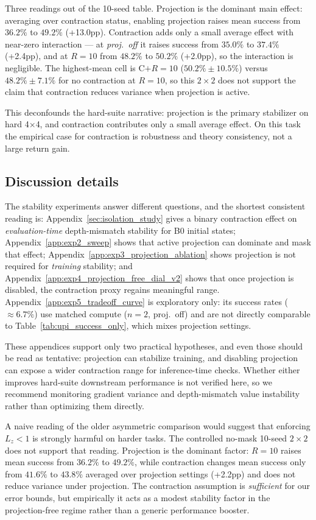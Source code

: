 \documentclass{article}
\theoremstyle{plain}
\theoremstyle{definition}
\theoremstyle{remark}
\begin{document}
Three readings out of the 10-seed table. Projection is the dominant main effect: averaging over contraction status, enabling projection raises mean success from $36.2\%$ to $49.2\%$ (+13.0pp). Contraction adds only a small average effect with near-zero interaction --- at \emph{proj.\ off} it raises success from $35.0\%$ to $37.4\%$ (+2.4pp), and at $R{=}10$ from $48.2\%$ to $50.2\%$ (+2.0pp), so the interaction is negligible. The highest-mean cell is C$+R{=}10$ ($50.2\%\pm 10.5\%$) versus $48.2\%\pm 7.1\%$ for no contraction at $R{=}10$, so this $2\times 2$ does not support the claim that contraction reduces variance when projection is active.

This deconfounds the hard-suite narrative: projection is the primary stabilizer on hard 4$\times$4, and contraction contributes only a small average effect. On this task the empirical case for contraction is robustness and theory consistency, not a large return gain.

\subsection{Discussion details}
\label{app:discussion_details}

The stability experiments answer different questions, and the shortest consistent reading is:
Appendix~\ref{sec:isolation_study} gives a binary contraction effect on \emph{evaluation-time} depth-mismatch stability for B0 initial states;
Appendix~\ref{app:exp2_sweep} shows that active projection can dominate and mask that effect;
Appendix~\ref{app:exp3_projection_ablation} shows projection is not required for \emph{training} stability;
and Appendix~\ref{app:exp4_projection_free_dial_v2} shows that once projection is disabled, the contraction proxy regains meaningful range.
Appendix~\ref{app:exp5_tradeoff_curve} is exploratory only: its success rates (${\approx}6.7\%$) use matched compute ($n{=}2$, proj.\ off) and are not directly comparable to Table~\ref{tab:upi_success_only}, which mixes projection settings.

These appendices support only two practical hypotheses, and even those should be read as tentative: projection can stabilize training, and disabling projection can expose a wider contraction range for inference-time checks. Whether either improves hard-suite downstream performance is not verified here, so we recommend monitoring gradient variance and depth-mismatch value instability rather than optimizing them directly.

A naive reading of the older asymmetric comparison would suggest that enforcing $L_z<1$ is strongly harmful on harder tasks. The controlled no-mask 10-seed $2\times 2$ does not support that reading. Projection is the dominant factor: $R{=}10$ raises mean success from $36.2\%$ to $49.2\%$, while contraction changes mean success only from $41.6\%$ to $43.8\%$ averaged over projection settings (+2.2pp) and does not reduce variance under projection. The contraction assumption is \emph{sufficient} for our error bounds, but empirically it acts as a modest stability factor in the projection-free regime rather than a generic performance booster.
\end{document}
